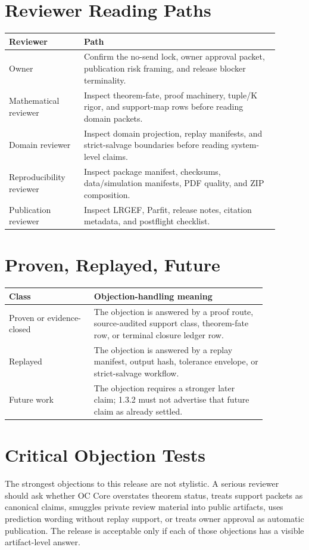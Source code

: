 \documentclass[11pt,a4paper]{article}
\begin{document}
\section*{Reviewer Reading Paths}
\begin{longtable}{>{\raggedright\arraybackslash}p{0.25\linewidth}>{\raggedright\arraybackslash}p{0.65\linewidth}}
\textbf{Reviewer} & \textbf{Path}\\
\hline
Owner & Confirm the no-send lock, owner approval packet, publication risk framing, and release blocker terminality.\\
Mathematical reviewer & Inspect theorem-fate, proof machinery, tuple/K rigor, and support-map rows before reading domain packets.\\
Domain reviewer & Inspect domain projection, replay manifests, and strict-salvage boundaries before reading system-level claims.\\
Reproducibility reviewer & Inspect package manifest, checksums, data/simulation manifests, PDF quality, and ZIP composition.\\
Publication reviewer & Inspect LRGEF, Parfit, release notes, citation metadata, and postflight checklist.\\
\end{longtable}

\section*{Proven, Replayed, Future}
\begin{longtable}{>{\raggedright\arraybackslash}p{0.28\linewidth}>{\raggedright\arraybackslash}p{0.58\linewidth}}
\textbf{Class} & \textbf{Objection-handling meaning}\\
\hline
Proven or evidence-closed & The objection is answered by a proof route, source-audited support class, theorem-fate row, or terminal closure ledger row.\\
Replayed & The objection is answered by a replay manifest, output hash, tolerance envelope, or strict-salvage workflow.\\
Future work & The objection requires a stronger later claim; 1.3.2 must not advertise that future claim as already settled.\\
\end{longtable}

\section*{Critical Objection Tests}
The strongest objections to this release are not stylistic. A serious reviewer should ask whether OC Core overstates theorem status, treats support packets as canonical claims, smuggles private review material into public artifacts, uses prediction wording without replay support, or treats owner approval as automatic publication. The release is acceptable only if each of those objections has a visible artifact-level answer.
\end{document}
